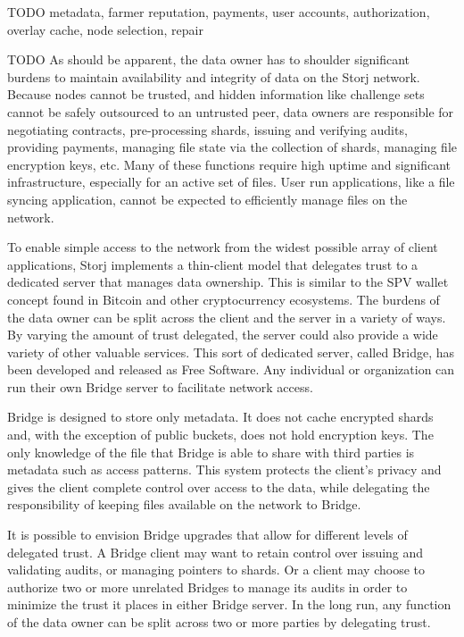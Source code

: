 \documentclass[a4paper,10pt]{article} \usepackage[utf8]{inputenc}
\newcommand{\todo}[1]{{\color{red} TODO #1 }}
\begin{document}
\todo{metadata, farmer reputation, payments, user accounts, authorization,
overlay cache, node selection, repair}

\todo{ As should be apparent, the data owner has to shoulder significant burdens
to maintain availability and integrity of data on the Storj network. Because
nodes cannot be trusted, and hidden information like challenge sets cannot be
safely outsourced to an untrusted peer, data owners are responsible for
negotiating contracts, pre-processing shards, issuing and verifying audits,
providing payments, managing file state via the collection of shards, managing
file encryption keys, etc. Many of these functions require high uptime and
significant infrastructure, especially for an active set of files. User run
applications, like a file syncing application, cannot be expected to efficiently
manage files on the network.

To enable simple access to the network from the widest possible array of client
applications, Storj implements a thin-client model that delegates trust to a
dedicated server that manages data ownership. This is similar to the SPV wallet
concept found in Bitcoin and other cryptocurrency ecosystems. The burdens of the
data owner can be split across the client and the server in a variety of ways.
By varying the amount of trust delegated, the server could also provide a wide
variety of other valuable services. This sort of dedicated server, called
Bridge, has been developed and released as Free Software. Any individual or
organization can run their own Bridge server to facilitate network access.

Bridge is designed to store only metadata. It does not cache encrypted shards
and, with the exception of public buckets, does not hold encryption keys. The
only knowledge of the file that Bridge is able to share with third parties is
metadata such as access patterns. This system protects the client's privacy and
gives the client complete control over access to the data, while delegating the
responsibility of keeping files available on the network to Bridge.

It is possible to envision Bridge upgrades that allow for different levels of
delegated trust. A Bridge client may want to retain control over issuing and
validating audits, or managing pointers to shards. Or a client may choose to
authorize two or more unrelated Bridges to manage its audits in order to
minimize the trust it places in either Bridge server. In the long run, any
function of the data owner can be split across two or more parties by delegating
trust. }
\end{document}
